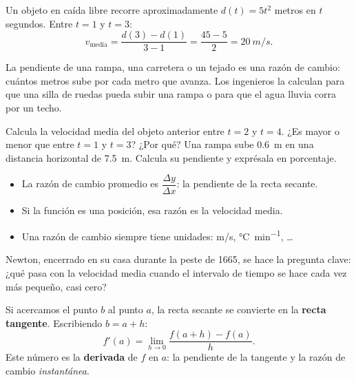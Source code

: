\documentclass[11pt]{article}
\begin{document}
\begin{ejemplo}
Un objeto en caída libre recorre aproximadamente $d(t)=5t^2$ metros en
$t$ segundos. Entre $t=1$ y $t=3$:
\[
  v_{\text{media}} = \frac{d(3)-d(1)}{3-1} = \frac{45-5}{2} = \qty{20}{m/s}.
\]
\end{ejemplo}

\begin{aplicacion}
La pendiente de una rampa, una carretera o un tejado es una razón de
cambio: cuántos metros sube por cada metro que avanza. Los ingenieros la
calculan para que una silla de ruedas pueda subir una rampa o para que el
agua lluvia corra por un techo.
\end{aplicacion}

\begin{preguntas}
\pregunta Calcula la velocidad media del objeto anterior entre $t=2$ y
$t=4$. ¿Es mayor o menor que entre $t=1$ y $t=3$? ¿Por qué?
\espacio{2.5cm}
\pregunta Una rampa sube \qty{0,6}{m} en una distancia horizontal de
\qty{7,5}{m}. Calcula su pendiente y exprésala en porcentaje.
\espacio{2.5cm}
\end{preguntas}

\begin{resumen}
\begin{itemize}
  \item La razón de cambio promedio es $\dfrac{\Delta y}{\Delta x}$: la
        pendiente de la recta secante.
  \item Si la función es una posición, esa razón es la velocidad media.
  \item Una razón de cambio siempre tiene unidades: \unit{m/s}, \unit{\degreeCelsius\per\minute}, \ldots
\end{itemize}
\end{resumen}

\label{tema:tangente}

\begin{hilo}
Newton, encerrado en su casa durante la peste de 1665, se hace la
pregunta clave: ¿qué pasa con la velocidad media cuando el intervalo de
tiempo se hace cada vez más pequeño, casi cero?
\end{hilo}

Si acercamos el punto $b$ al punto $a$, la recta secante se convierte en
la \textbf{recta tangente}. Escribiendo $b=a+h$:
\[
  f'(a) = \lim_{h\to 0} \frac{f(a+h)-f(a)}{h}.
\]
Este número es la \textbf{derivada} de $f$ en $a$: la pendiente de la
tangente y la razón de cambio \emph{instantánea}.
\end{document}
